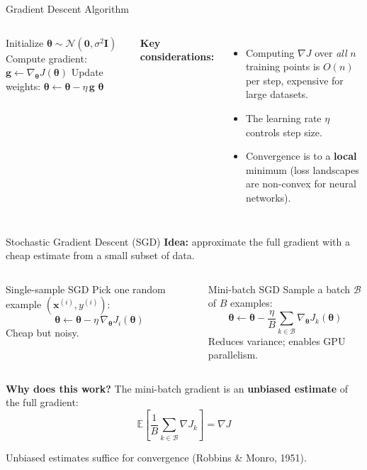 \documentclass[aspectratio=169,11pt]{beamer}
\newcommand{\x}{\bm{x}}
\newcommand{\E}[1]{\mathbb{E}\!\left[#1\right]}
\begin{document}
\begin{frame}{Gradient Descent Algorithm}
\begin{columns}[T]
\begin{algorithm}[H]
\caption*{\textbf{Gradient Descent}}
\begin{algorithmic}[1]
\STATE Initialize $\bm{\theta} \sim \mathcal{N}(\bm{0}, \sigma^2\bm{I})$
\REPEAT
    \STATE Compute gradient: $\bm{g} \leftarrow \nabla_{\!\bm{\theta}} J(\bm{\theta})$
    \STATE Update weights: $\bm{\theta} \leftarrow \bm{\theta} - \eta\,\bm{g}$
\RETURN $\bm{\theta}$
\end{algorithmic}
\end{algorithm}

\textbf{Key considerations:}
\begin{itemize}
    \item Computing $\nabla J$ over \emph{all} $n$ training points is $O(n)$ per step, expensive for large datasets.
    \item The learning rate $\eta$ controls step size.
    \item Convergence is to a \textbf{local} minimum (loss landscapes are non-convex for neural networks).
\end{itemize}
\end{columns}
\end{frame}

\begin{frame}{Stochastic Gradient Descent (SGD)}
\textbf{Idea:} approximate the full gradient with a cheap estimate from a small subset of data.

\vspace{0.3cm}
\begin{columns}[T]
\begin{block}{Single-sample SGD}
Pick one random example $(\x^{(i)},y^{(i)})$:
\[
    \bm{\theta} \leftarrow \bm{\theta} - \eta\,\nabla_{\!\bm{\theta}} J_i(\bm{\theta})
\]
Cheap but noisy.
\end{block}

\begin{block}{Mini-batch SGD}
Sample a batch $\mathcal{B}$ of $B$ examples:
\[
    \bm{\theta} \leftarrow \bm{\theta} - \frac{\eta}{B}\sum_{k\in\mathcal{B}} \nabla_{\!\bm{\theta}} J_k(\bm{\theta})
\]
Reduces variance; enables GPU parallelism.
\end{block}
\end{columns}

\vspace{0.15cm}
{\small\textbf{Why does this work?} The mini-batch gradient is an \textbf{unbiased estimate} of the full gradient:}
\vspace{-0.15cm}
\[
    \E{\frac{1}{B}\sum_{k\in\mathcal{B}}\nabla J_k} = \nabla J
\]
\vspace{-0.4cm}

{\small Unbiased estimates suffice for convergence (Robbins \& Monro, 1951).}
\end{frame}
\end{document}
